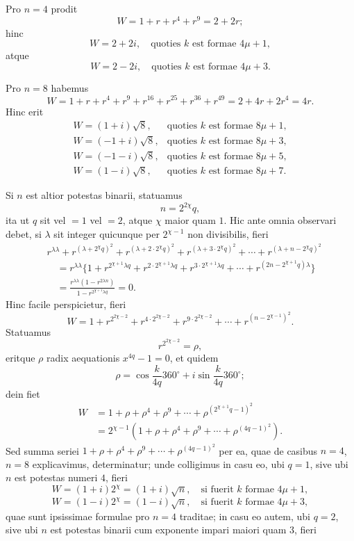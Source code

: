 \documentclass[12pt]{article}
\begin{document}
Pro $n=4$ prodit
\[
W=1+r+r^4+r^9=2+2r;
\]
hinc
\[
W=2+2i,\quad\text{quoties }k\text{ est formae }4\mu+1,
\]
atque
\[
W=2-2i,\quad\text{quoties }k\text{ est formae }4\mu+3.
\]

Pro $n=8$ habemus
\[
W=1+r+r^4+r^9+r^{16}+r^{25}+r^{36}+r^{49}=2+4r+2r^4=4r.
\]
Hinc erit
\[
\begin{array}{ll}
W=(1+i)\sqrt8, & \text{quoties }k\text{ est formae }8\mu+1,\\
W=(-1+i)\sqrt8, & \text{quoties }k\text{ est formae }8\mu+3,\\
W=(-1-i)\sqrt8, & \text{quoties }k\text{ est formae }8\mu+5,\\
W=(1-i)\sqrt8, & \text{quoties }k\text{ est formae }8\mu+7.
\end{array}
\]

Si $n$ est altior potestas binarii, statuamus
\[
n=2^{2\chi}q,
\]
ita ut $q$ sit vel $=1$ vel $=2$, atque $\chi$ maior quam $1$. Hic ante omnia observari debet, si $\lambda$ sit integer quicunque per $2^{\chi-1}$ non divisibilis, fieri
\[
\begin{aligned}
&r^{\lambda\lambda}+r^{(\lambda+2^\chi q)^2}+r^{(\lambda+2\cdot2^\chi q)^2}
+r^{(\lambda+3\cdot2^\chi q)^2}+\cdots+r^{(\lambda+n-2^\chi q)^2}\\
&\quad
=r^{\lambda\lambda}\{1+r^{2^{\chi+1}\lambda q}
+r^{2\cdot2^{\chi+1}\lambda q}
+r^{3\cdot2^{\chi+1}\lambda q}
+\cdots+r^{(2n-2^{\chi+1}q)\lambda}\}\\
&\quad
=\frac{r^{\lambda\lambda}(1-r^{2\lambda n})}{1-r^{2^{\chi+1}\lambda q}}=0.
\end{aligned}
\]
Hinc facile perspicietur, fieri
\[
W=1+r^{2^{2\chi-2}}+r^{4\cdot 2^{2\chi-2}}+r^{9\cdot 2^{2\chi-2}}+\cdots+r^{(n-2^{\chi-1})^2}.
\]
Statuamus
\[
r^{2^{2\chi-2}}=\rho,
\]
eritque $\rho$ radix aequationis $x^{4q}-1=0$, et quidem
\[
\rho=\cos\frac{k}{4q}360^\circ+i\sin\frac{k}{4q}360^\circ;
\]
dein fiet
\[
\begin{aligned}
W&=1+\rho+\rho^4+\rho^9+\cdots+\rho^{(2^{\chi+1}q-1)^2}\\
&=2^{\chi-1}(1+\rho+\rho^4+\rho^9+\cdots+\rho^{(4q-1)^2}).
\end{aligned}
\]
Sed summa seriei $1+\rho+\rho^4+\rho^9+\cdots+\rho^{(4q-1)^2}$ per ea, quae de casibus $n=4$, $n=8$ explicavimus, determinatur; unde colligimus in casu eo, ubi $q=1$, sive ubi $n$ est potestas numeri $4$, fieri
\[
W=(1+i)2^\chi=(1+i)\sqrt n,\quad\text{si fuerit }k\text{ formae }4\mu+1,
\]
\[
W=(1-i)2^\chi=(1-i)\sqrt n,\quad\text{si fuerit }k\text{ formae }4\mu+3,
\]
quae sunt ipsissimae formulae pro $n=4$ traditae; in casu eo autem, ubi $q=2$, sive ubi $n$ est potestas binarii cum exponente impari maiori quam $3$, fieri
\end{document}

